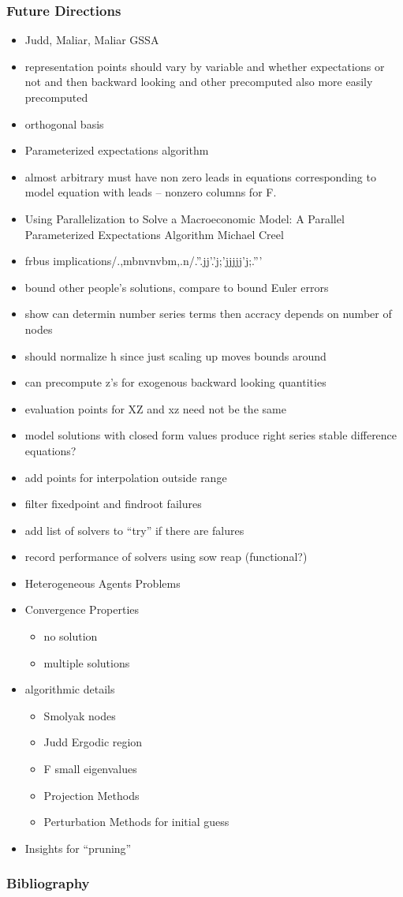 \documentclass[tikz]{beamer}
\begin{document}
\begin{frame}
  \frametitle{Future Directions}
  \begin{itemize}
  \item Judd, Maliar, Maliar GSSA
  \item representation points should vary by variable and whether expectations or not and then backward looking and other precomputed also more easily precomputed
  \item orthogonal basis
  \item Parameterized expectations algorithm
  \item almost arbitrary must have non zero leads in equations corresponding to model equation with leads -- nonzero columns for F.
  \item Using Parallelization to Solve a Macroeconomic Model: A Parallel Parameterized Expectations Algorithm
Michael Creel
  \item frbus implications/.,mbnvnvbm,.n/.''.jj'.'j;'jjjjj'j;.'''
  \item bound other people's solutions, compare to bound Euler errors
  \item show can determin number series terms then accracy depends on number of nodes
  \item should normalize h since just scaling up moves bounds around
  \item can precompute z's for exogenous backward looking quantities
  \item evaluation points for XZ and xz need not be the same
  \item model solutions with closed form values produce right series stable difference equations?
  \item add points for interpolation outside range
  \item filter fixedpoint and findroot failures
  \item add list of solvers to ``try'' if there are falures
  \item record performance of solvers using sow reap (functional?)
  \item Heterogeneous Agents Problems
  \item Convergence Properties
    \begin{itemize}
    \item no solution
    \item multiple solutions
    \end{itemize}
\item algorithmic details
  \begin{itemize}
 \item Smolyak nodes
 \item Judd Ergodic region
 \item F small eigenvalues
 \item Projection Methods
 \item Perturbation Methods for initial guess
  \end{itemize}
\item Insights for ``pruning''
  \end{itemize}
\end{frame}

\begin{frame}
  \frametitle{Bibliography}
  


\end{frame}

\appendix
\end{document}
